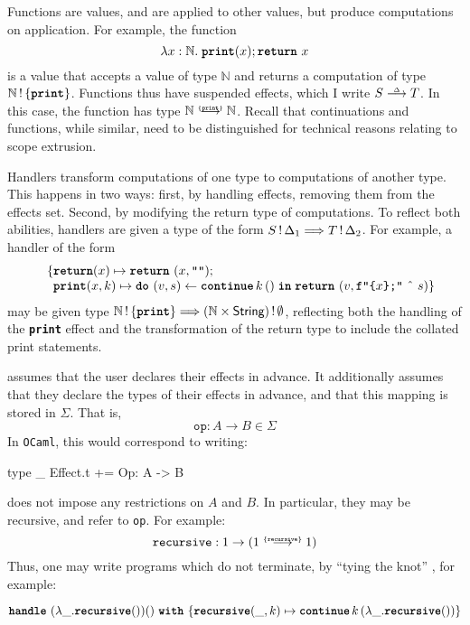 Functions are values, and are applied to other values, but produce computations on application. For example, the function 
\[
\function{x:\mathbb{N}}{\; \textbf{\texttt{print}}(x); \return{x}}
\]
is a value that accepts a value of type $\mathbb{N}$ and returns a computation of type $\effectType[\{\textbf{\texttt{print}} \}]{\mathbb{N}}$. Functions thus have suspended effects, which I write $\functionType{S}{T}$. In this case, the function has type $\functionType[\{ \textbf{\texttt{print}} \}]{\mathbb{N}}{\mathbb{N}}$. Recall that continuations and functions, while similar, need to be distinguished for technical reasons relating to scope extrusion. 

Handlers transform computations of one type to computations of another type. This happens in two ways: first, by handling effects, removing them from the effects set. Second, by modifying the return type of computations. To reflect both abilities, handlers are given a type of the form $\handlerType{\effectType[\Delta_1]{S}}{\effectType[\Delta_2]{T}}$. For example, a handler of the form  
\[ \begin{array}{ll}
  \quad \{ \textbf{\texttt{return}}(x) \mapsto {\return{(x, \texttt{""})}}; \\
    \quad \, \,\, \textbf{\texttt{print}}(x, k) \mapsto {\bind{(v, s)}{\continue{k}{()}}{\return{(v, \texttt{f"\{$x$\};"} \text{ \^\ } s)}}}\}
  \end{array}
\]
may be given type $\handlerType{\effectType[\{ \textbf{\texttt{print}} \}]{\mathbb{N}}}{\effectType[\emptyset]{(\mathbb{N} \times \textsf{String})}}$, reflecting both the handling of the \textbf{\texttt{print}} effect and the transformation of the return type to include the collated print statements.

\efflang{} assumes that the user declares their effects in advance. It additionally assumes that they declare the types of their effects in advance, and that this mapping is stored in $\Sigma$. That is, 
\[\texttt{op}: A \to B \in \Sigma \]
In \texttt{OCaml}, this would correspond to writing:
\begin{ocaml}
type _ Effect.t += Op: A -> B
\end{ocaml}
\efflang{} does not impose any restrictions on $A$ and $B$. In particular, they may be recursive, and refer to \texttt{op}. For example:
\[\texttt{recursive}: 1 \to (\functionType[\{ \texttt{recursive} \}]{1}{1})\]
Thus, one may write programs which do not terminate, by ``tying the knot'' \citep{landin-64}, for example:
\begin{eff}
  $\handleWith{(\lambda \_ . \textbf{\texttt{recursive}} ()) ()}{\textbf{\texttt{recursive}}(\_, k) \mapsto {\continue{k}{(\lambda \_. \textbf{\texttt{recursive}} ())}}}$
\end{eff}

